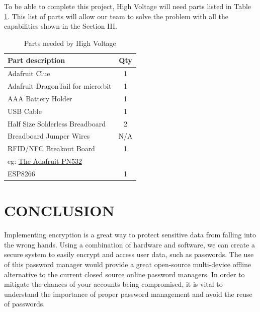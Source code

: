 \documentclass[12pt]{article}
\begin{document}
To be able to complete this project, High Voltage will need parts listed in Table \ref{table:parts_list}. This list of parts will allow our team to solve the problem with all the capabilities shown in the Section III.

\begin{table}[!h]
    \caption{Parts needed by High Voltage}
    \label{table:parts_list}
    \begin{center}
        \begin{tabular}{|p{3in}|c|}
            \hline
            Part description & Qty\\
            \hline
            \hline
            Adafruit Clue & 1 \\
            \hline
            Adafruit DragonTail for micro:bit & 1 \\
            \hline
            AAA Battery Holder & 1 \\
            \hline
            USB Cable & 1 \\
            \hline
            Half Size Solderless Breadboard & 2 \\
            \hline
            Breadboard Jumper Wires & N/A \\
            \hline
            RFID/NFC Breakout Board & 1 \\
            eg: \href{https://www.adafruit.com/product/364}{The Adafruit PN532} & \\
            \hline
            ESP8266 & 1 \\
            \hline
        \end{tabular}
    \end{center}
\end{table}


\section{CONCLUSION}
Implementing encryption is a great way to protect sensitive data from falling into the wrong hands. Using a combination of hardware and software, we can create a secure system to easily encrypt and access user data, such as passwords. The use of this password manager would provide a great open-source multi-device offline alternative to the current closed source online password managers. In order to mitigate the chances of your accounts being compromised, it is vital to understand the importance of proper password management and avoid the reuse of passwords. 


\newpage
\printbibliography
%
%
\end{document}
